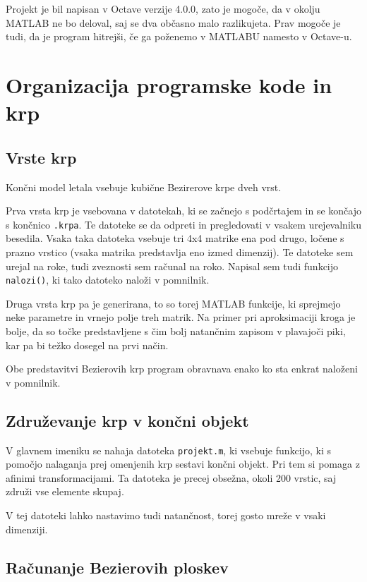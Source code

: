 \documentclass[a4paper,11pt]{article}
\begin{document}
	Projekt je bil napisan v Octave verzije 4.0.0, zato je mogoče, da v okolju MATLAB ne bo deloval, saj se dva občasno malo razlikujeta. Prav mogoče je tudi, da je program hitrejši, če ga poženemo v MATLABU namesto v Octave-u.
	
	\section{Organizacija programske kode in krp}
	
	\subsection{Vrste krp}
	
	Končni model letala vsebuje kubične Bezirerove krpe dveh vrst.
	
	Prva vrsta krp je vsebovana v datotekah, ki se začnejo s podčrtajem in se končajo s končnico \texttt{.krpa}. Te datoteke se da odpreti in pregledovati v vsakem urejevalniku besedila. Vsaka taka datoteka vsebuje tri 4x4 matrike ena pod drugo, ločene s prazno vrstico (vsaka matrika predstavlja eno izmed dimenzij). Te datoteke sem urejal na roke, tudi zveznosti sem računal na roko. Napisal sem tudi funkcijo \texttt{nalozi()}, ki tako datoteko naloži v pomnilnik.
	
	Druga vrsta krp pa je generirana, to so torej MATLAB funkcije, ki sprejmejo neke parametre in vrnejo polje treh matrik. Na primer pri aproksimaciji kroga je bolje, da so točke predstavljene s čim bolj natančnim zapisom v plavajoči piki, kar pa bi težko dosegel na prvi način.
	
	Obe predstavitvi Bezierovih krp program obravnava enako ko sta enkrat naloženi v pomnilnik.
	
	\subsection{Združevanje krp v končni objekt}
	
	V glavnem imeniku se nahaja datoteka \texttt{projekt.m}, ki vsebuje funkcijo, ki s pomočjo nalaganja prej omenjenih krp sestavi končni objekt. Pri tem si pomaga z afinimi transformacijami. Ta datoteka je precej obsežna, okoli 200 vrstic, saj združi vse elemente skupaj.
	
	V tej datoteki lahko nastavimo tudi natančnost, torej gosto mreže v vsaki dimenziji. 
	
	\subsection{Računanje Bezierovih ploskev}
	
\end{document}
